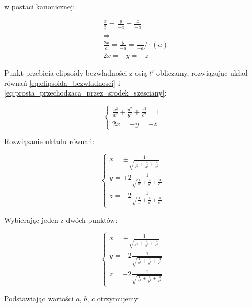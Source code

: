 \documentclass[a4paper,12pt]{article}
\begin{document}
w postaci kanonicznej:

\begin{align*}
     & \frac{x}{\frac{a}{2}} = \frac{y}{-a} = \frac{z}{-a}    \\
     & \Rightarrow                                            \\
     & \frac{2x}{a} = \frac{y}{-a} = \frac{z}{-a} / \cdot (a) \\
     & 2x = -y = -z
\end{align*}

Punkt przebicia elipsoidy bezwładności z osią $t'$ obliczamy, rozwiązując układ równań \eqref{eq:elipsoida_bezwladnosci} i \eqref{eq:prosta_przechodzaca_przez_srodek_szesciany}:



$$
    \begin{cases}
        \frac{x^2}{a^2} + \frac{y^2}{b^2} + \frac{z^2}{c^2} = 1 \\
        2x = -y = -z
    \end{cases}
$$


Rozwiązanie układu równań:


\[
    \begin{cases}
        x = \pm\frac{1}{\sqrt{\frac{1}{a^2} + \frac{4}{b^2} + \frac{4}{c^2}}}  \\
        y = \mp2\frac{1}{\sqrt{\frac{1}{a^2} + \frac{4}{b^2} + \frac{4}{c^2}}} \\
        z = \mp2\frac{1}{\sqrt{\frac{1}{a^2} + \frac{4}{b^2} + \frac{4}{c^2}}}
    \end{cases}
\]

Wybierając jeden z dwóch punktów:


\[
    \begin{cases}
        x = +\frac{1}{\sqrt{\frac{1}{a^2} + \frac{4}{b^2} + \frac{4}{c^2}}}  \\
        y = -2\frac{1}{\sqrt{\frac{1}{a^2} + \frac{4}{b^2} + \frac{4}{c^2}}} \\
        z = -2\frac{1}{\sqrt{\frac{1}{a^2} + \frac{4}{b^2} + \frac{4}{c^2}}}
    \end{cases}
\]

Podstawiając wartości $a$, $b$, $c$ otrzymujemy:



\end{document}
